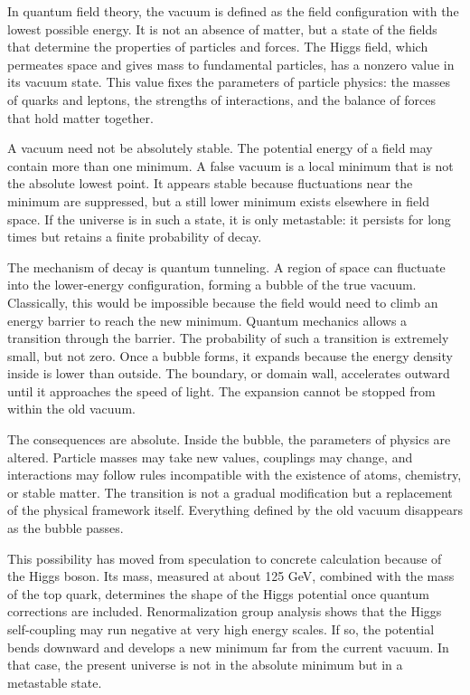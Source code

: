 

\begin{phenomenon}
In quantum field theory, the vacuum is defined as the field configuration with the lowest possible energy. It is not an absence of matter, but a state of the fields that determine the properties of particles and forces. The Higgs field, which permeates space and gives mass to fundamental particles, has a nonzero value in its vacuum state. This value fixes the parameters of particle physics: the masses of quarks and leptons, the strengths of interactions, and the balance of forces that hold matter together.

A vacuum need not be absolutely stable. The potential energy of a field may contain more than one minimum. A false vacuum is a local minimum that is not the absolute lowest point. It appears stable because fluctuations near the minimum are suppressed, but a still lower minimum exists elsewhere in field space. If the universe is in such a state, it is only metastable: it persists for long times but retains a finite probability of decay.

The mechanism of decay is quantum tunneling. A region of space can fluctuate into the lower-energy configuration, forming a bubble of the true vacuum. Classically, this would be impossible because the field would need to climb an energy barrier to reach the new minimum. Quantum mechanics allows a transition through the barrier. The probability of such a transition is extremely small, but not zero. Once a bubble forms, it expands because the energy density inside is lower than outside. The boundary, or domain wall, accelerates outward until it approaches the speed of light. The expansion cannot be stopped from within the old vacuum.

The consequences are absolute. Inside the bubble, the parameters of physics are altered. Particle masses may take new values, couplings may change, and interactions may follow rules incompatible with the existence of atoms, chemistry, or stable matter. The transition is not a gradual modification but a replacement of the physical framework itself. Everything defined by the old vacuum disappears as the bubble passes.

This possibility has moved from speculation to concrete calculation because of the Higgs boson. Its mass, measured at about 125 GeV, combined with the mass of the top quark, determines the shape of the Higgs potential once quantum corrections are included. Renormalization group analysis shows that the Higgs self-coupling may run negative at very high energy scales. If so, the potential bends downward and develops a new minimum far from the current vacuum. In that case, the present universe is not in the absolute minimum but in a metastable state.


\end{phenomenon}
